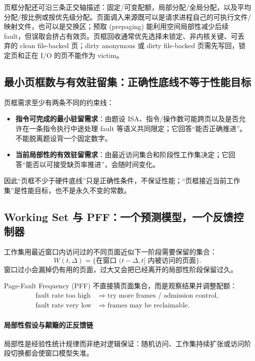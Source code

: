 \documentclass[11pt,a4paper]{ctexart}
\newcommand{\kw}[1]{\textbf{#1}}
\begin{document}
页框分配还可沿三条正交轴描述：固定/可变配额，局部分配/全局分配，以及平均分配/按比例或按优先级分配。页面调入来源既可以是请求进程自己的可执行文件/映射文件，也可以是交换区；预取 (prepaging) 能利用空间局部性减少后续 fault，但误取会挤占有效页。页框回收通常优先选择未锁定、非内核关键、可丢弃的 clean file-backed 页；dirty anonymous 或 dirty file-backed 页需先写回，锁定页和正在 I/O 的页不能作为 victim。

\subsection{最小页框数与有效驻留集：正确性底线不等于性能目标}

页框需求至少有两条不同的约束线：
\begin{itemize}
  \item \kw{指令可完成的最小驻留需求}：由题设 ISA、指令/操作数可能跨页以及是否允许在一条指令执行中途处理 fault 等语义共同限定；它回答“能否正确推进”。不能脱离题设背一个固定数字。
  \item \kw{当前局部性的有效驻留需求}：由最近访问集合和阶段性工作集决定；它回答“能否以可接受缺页率推进”，会随时间变化。
\end{itemize}

因此“页框不少于硬件底线”只是正确性条件，不保证性能；“页框接近当前工作集”是性能目标，也不是永久不变的常数。

\subsection{Working Set 与 PFF：一个预测模型，一个反馈控制器}

工作集用最近窗口内访问过的不同页面近似下一阶段需要保留的集合：
\[
W(t,\Delta)=\{\text{在窗口 }(t-\Delta,t]\text{ 内被访问的页面}\}.
\]
窗口过小会漏掉仍有用的页面，过大又会把已经离开的局部性阶段保留过久。

Page-Fault Frequency (PFF) 不直接猜页面集合，而是观察结果并调整配额：
\[
\boxed{
\begin{aligned}
\text{fault rate too high}&\Rightarrow\text{try more frames / admission control},\\
\text{fault rate very low}&\Rightarrow\text{frames may be reclaimable}.
\end{aligned}}
\]

\paragraph{局部性假设与颠簸的正反馈链}
局部性是经验性统计规律而非绝对逻辑保证：随机访问、工作集持续扩张或访问阶段切换都会使窗口模型失准。
\end{document}
